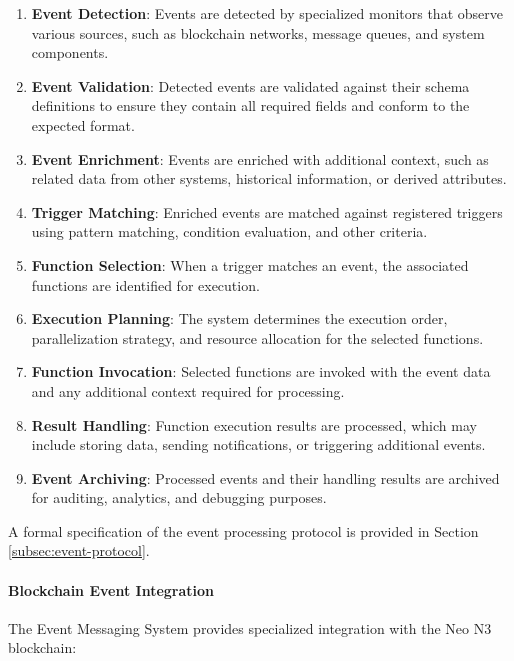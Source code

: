 \documentclass{article}
\begin{document}
\begin{enumerate}
    \item \textbf{Event Detection}: Events are detected by specialized monitors that observe various sources, such as blockchain networks, message queues, and system components.
    
    \item \textbf{Event Validation}: Detected events are validated against their schema definitions to ensure they contain all required fields and conform to the expected format.
    
    \item \textbf{Event Enrichment}: Events are enriched with additional context, such as related data from other systems, historical information, or derived attributes.
    
    \item \textbf{Trigger Matching}: Enriched events are matched against registered triggers using pattern matching, condition evaluation, and other criteria.
    
    \item \textbf{Function Selection}: When a trigger matches an event, the associated functions are identified for execution.
    
    \item \textbf{Execution Planning}: The system determines the execution order, parallelization strategy, and resource allocation for the selected functions.
    
    \item \textbf{Function Invocation}: Selected functions are invoked with the event data and any additional context required for processing.
    
    \item \textbf{Result Handling}: Function execution results are processed, which may include storing data, sending notifications, or triggering additional events.
    
    \item \textbf{Event Archiving}: Processed events and their handling results are archived for auditing, analytics, and debugging purposes.
\end{enumerate}

A formal specification of the event processing protocol is provided in Section \ref{subsec:event-protocol}.



\paragraph{Blockchain Event Integration}
The Event Messaging System provides specialized integration with the Neo N3 blockchain:
\end{document}
